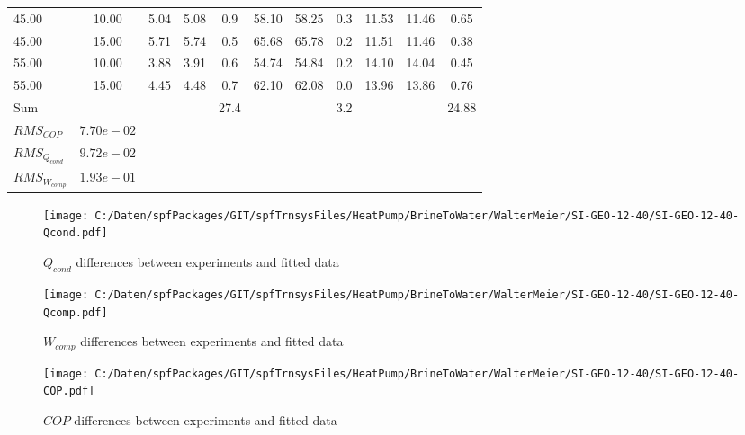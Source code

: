 \documentclass[english]{SPFShortReport}
\begin{document}
\begin{table}[!ht]
\begin{small}
\begin{center}
{\begin{tabular}{l | c c c c c c c c c c }
45.00  & 10.00 & 5.04 & 5.08 & 0.9 & 58.10 & 58.25 & 0.3 & 11.53 & 11.46 & 0.65\\ 
45.00  & 15.00 & 5.71 & 5.74 & 0.5 & 65.68 & 65.78 & 0.2 & 11.51 & 11.46 & 0.38\\ 
55.00  & 10.00 & 3.88 & 3.91 & 0.6 & 54.74 & 54.84 & 0.2 & 14.10 & 14.04 & 0.45\\ 
55.00  & 15.00 & 4.45 & 4.48 & 0.7 & 62.10 & 62.08 & 0.0 & 13.96 & 13.86 & 0.76\\ 
\hline 
 Sum &  & &  & 27.4 &  &  & 3.2 & &  & 24.88\\ 
\hline 
 $RMS_{COP}$ & $7.70e-02$ \\ 
 $RMS_{Q_{cond}}$ & $9.72e-02$ \\ 
 $RMS_{W_{comp}}$ & $1.93e-01$ \\ 
\hline
\hline
\end{tabular}
}
\label{ErrorsTable}
\end{center}
\end{small}
\end{table}
\begin{figure}[!ht]
\begin{center}
\texttt{[image: C:/Daten/spfPackages/GIT/spfTrnsysFiles/HeatPump/BrineToWater/WalterMeier/SI-GEO-12-40/SI-GEO-12-40-Qcond.pdf]}
\caption{$Q_{cond}$ differences between experiments and fitted data}
\label{QcongFig}
\end{center}
\end{figure}
\begin{figure}[!ht]
\begin{center}
\texttt{[image: C:/Daten/spfPackages/GIT/spfTrnsysFiles/HeatPump/BrineToWater/WalterMeier/SI-GEO-12-40/SI-GEO-12-40-Qcomp.pdf]}
\caption{$W_{comp}$ differences between experiments and fitted data}
\label{QcompFig}
\end{center}
\end{figure}
\begin{figure}[!ht]
\begin{center}
\texttt{[image: C:/Daten/spfPackages/GIT/spfTrnsysFiles/HeatPump/BrineToWater/WalterMeier/SI-GEO-12-40/SI-GEO-12-40-COP.pdf]}
\caption{$COP$ differences between experiments and fitted data}
\label{COPFig}
\end{center}
\end{figure}
\end{document}
